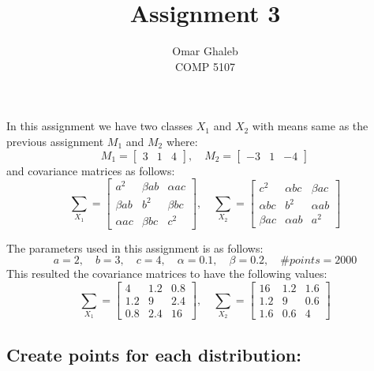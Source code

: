 \documentclass[11pt, oneside]{article}   	%
\title{Assignment 3}
\author{Omar Ghaleb\\
COMP 5107}
\date{}							%
\begin{document}
\renewcommand\thesubsection{\alph{subsection}.}
\maketitle
In this assignment we have two classes $X_1$ and $X_2$ with means same as the previous assignment $M_1$ and $M_2$ where: $$M_1 = \begin{bmatrix}
3 & 1 & 4 
\end{bmatrix},\quad M_2 = \begin{bmatrix}
-3 & 1 & -4 
\end{bmatrix}$$
  and covariance matrices as follows: 
  $$\sum_{X_1} = \begin{bmatrix}
a^2 & \beta ab & \alpha ac \\
\beta ab & b^2 & \beta bc \\
\alpha ac & \beta bc & c^2 
\end{bmatrix},\quad \sum_{X_2} = \begin{bmatrix}
c^2 & \alpha bc & \beta ac \\
\alpha bc & b^2 & \alpha ab \\
\beta ac & \alpha ab & a^2 
\end{bmatrix}$$

The parameters used in this assignment is as follows:
$$ a=2,\quad b=3,\quad c=4,\quad \alpha=0.1,\quad \beta=0.2,\quad \#points = 2000 $$
This resulted the covariance matrices to have the following values:
$$\sum_{X_1} = \begin{bmatrix}
4 & 1.2 & 0.8 \\
1.2 & 9 & 2.4 \\
0.8 & 2.4 & 16 
\end{bmatrix}, \quad \sum_{X_2} = \begin{bmatrix}
16 & 1.2 & 1.6 \\
1.2 & 9 & 0.6 \\
1.6 & 0.6 & 4 
\end{bmatrix}$$


\subsection{Create points for each distribution:}
\end{document}
